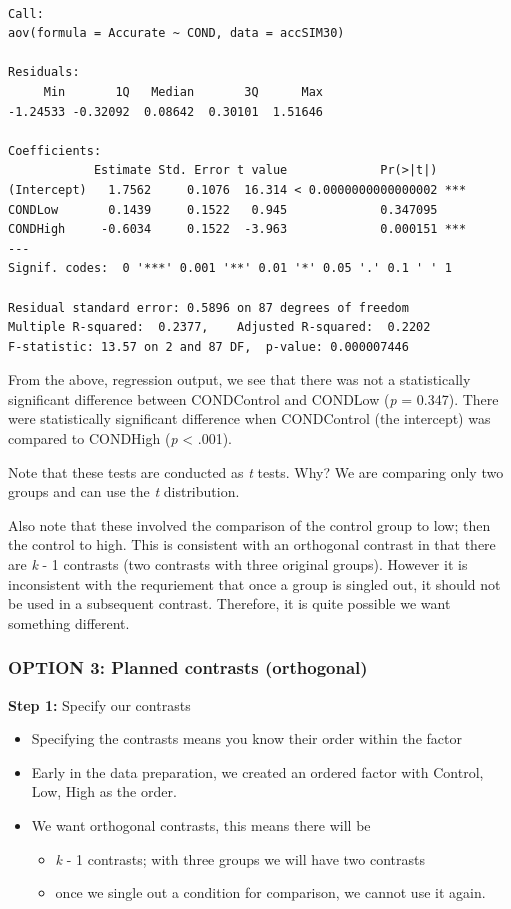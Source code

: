 \documentclass[
  11pt,
]{book}
\providecommand{\tightlist}{%
  \setlength{\itemsep}{0pt}\setlength{\parskip}{0pt}}
\begin{document}
\begin{verbatim}

Call:
aov(formula = Accurate ~ COND, data = accSIM30)

Residuals:
     Min       1Q   Median       3Q      Max 
-1.24533 -0.32092  0.08642  0.30101  1.51646 

Coefficients:
            Estimate Std. Error t value             Pr(>|t|)    
(Intercept)   1.7562     0.1076  16.314 < 0.0000000000000002 ***
CONDLow       0.1439     0.1522   0.945             0.347095    
CONDHigh     -0.6034     0.1522  -3.963             0.000151 ***
---
Signif. codes:  0 '***' 0.001 '**' 0.01 '*' 0.05 '.' 0.1 ' ' 1

Residual standard error: 0.5896 on 87 degrees of freedom
Multiple R-squared:  0.2377,    Adjusted R-squared:  0.2202 
F-statistic: 13.57 on 2 and 87 DF,  p-value: 0.000007446
\end{verbatim}

From the above, regression output, we see that there was not a statistically significant difference between CONDControl and CONDLow (\emph{p} = 0.347). There were statistically significant difference when CONDControl (the intercept) was compared to CONDHigh (\emph{p} \textless{} .001).

Note that these tests are conducted as \emph{t} tests. Why? We are comparing only two groups and can use the \emph{t} distribution.

Also note that these involved the comparison of the control group to low; then the control to high. This is consistent with an orthogonal contrast in that there are \emph{k} - 1 contrasts (two contrasts with three original groups). However it is inconsistent with the requriement that once a group is singled out, it should not be used in a subsequent contrast. Therefore, it is quite possible we want something different.

\hypertarget{option-3-planned-contrasts-orthogonal}{%
\subsubsection{OPTION 3: Planned contrasts (orthogonal)}\label{option-3-planned-contrasts-orthogonal}}

\textbf{Step 1: } Specify our contrasts

\begin{itemize}
\tightlist
\item
  Specifying the contrasts means you know their order within the factor
\item
  Early in the data preparation, we created an ordered factor with Control, Low, High as the order.
\item
  We want orthogonal contrasts, this means there will be

  \begin{itemize}
  \tightlist
  \item
    \emph{k} - 1 contrasts; with three groups we will have two contrasts
  \item
    once we single out a condition for comparison, we cannot use it again.
  \end{itemize}
\end{itemize}
\end{document}
